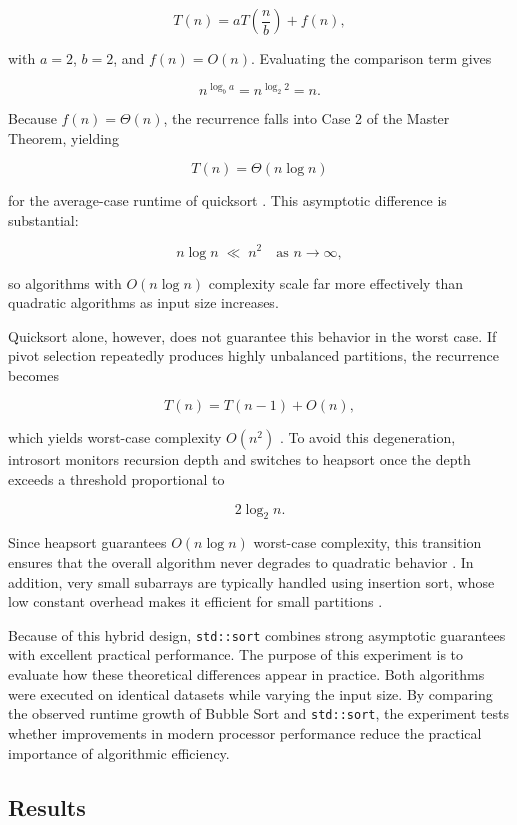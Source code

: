 \[
T(n) = aT\!\left(\frac{n}{b}\right) + f(n),
\]

with \(a = 2\), \(b = 2\), and \(f(n) = O(n)\). Evaluating the comparison term gives

\[
n^{\log_b a} = n^{\log_2 2} = n.
\]

Because \(f(n) = \Theta(n)\), the recurrence falls into Case 2 of the Master Theorem, yielding

\[
T(n) = \Theta(n \log n)
\]

for the average-case runtime of quicksort \cite{cormen2009, sedgewick2011}. This asymptotic difference is substantial:

\[
n \log n \;\ll\; n^2 \quad \text{as } n \to \infty,
\]

so algorithms with \(O(n \log n)\) complexity scale far more effectively than quadratic algorithms as input size increases.

Quicksort alone, however, does not guarantee this behavior in the worst case. If pivot selection repeatedly produces highly unbalanced partitions, the recurrence becomes

\[
T(n) = T(n-1) + O(n),
\]

which yields worst-case complexity \(O(n^2)\) \cite{knuth1998}. To avoid this degeneration, introsort monitors recursion depth and switches to heapsort once the depth exceeds a threshold proportional to

\[
2\log_2 n.
\]

Since heapsort guarantees \(O(n \log n)\) worst-case complexity, this transition ensures that the overall algorithm never degrades to quadratic behavior \cite{musser1997}. In addition, very small subarrays are typically handled using insertion sort, whose low constant overhead makes it efficient for small partitions \cite{cormen2009, sedgewick2011}.

Because of this hybrid design, \texttt{std::sort} combines strong asymptotic guarantees with excellent practical performance. The purpose of this experiment is to evaluate how these theoretical differences appear in practice. Both algorithms were executed on identical datasets while varying the input size. By comparing the observed runtime growth of Bubble Sort and \texttt{std::sort}, the experiment tests whether improvements in modern processor performance reduce the practical importance of algorithmic efficiency.

\subsection{Results}

